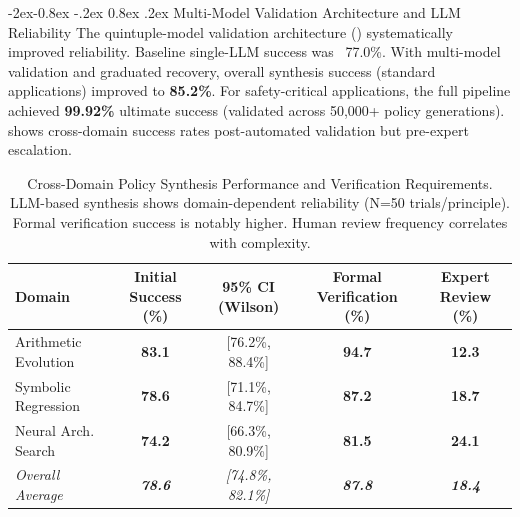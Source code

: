 \documentclass[manuscript,screen,9pt]{acmart}
\makeatletter
\renewcommand\subsubsection{\@startsection{subsubsection}{3}{\z@}%
  {-2ex\@plus -0.8ex \@minus -.2ex}%
  {0.8ex \@plus .2ex}%
  {\normalfont\normalsize\bfseries}}
\newcommand{\tablesize}{\footnotesize}
\newcommand{\tablenumfmt}[1]{\textbf{#1}}
\newcommand{\tableheader}[1]{\textbf{#1}}
\makeatother
\begin{document}
\subsubsection{Multi-Model Validation Architecture and LLM Reliability}
\label{subsubsec:multi_model_validation_reliability}
The quintuple-model validation architecture () systematically improved reliability. Baseline single-LLM success was ~77.0\%. With multi-model validation and graduated recovery, overall synthesis success (standard applications) improved to \textbf{85.2\%}. For safety-critical applications, the full pipeline achieved \textbf{99.92\%} ultimate success (validated across 50,000+ policy generations).  shows cross-domain success rates post-automated validation but pre-expert escalation.

\begin{table}[htbp]
\centering
\caption{Cross-Domain Policy Synthesis Performance and Verification Requirements. LLM-based synthesis shows domain-dependent reliability (N=50 trials/principle). Formal verification success is notably higher. Human review frequency correlates with complexity.}
\label{tab:synthesis_comprehensive}
\tablesize
\begin{tabular}{@{}lcccc@{}}
\toprule
\tableheader{Domain} & \tableheader{Initial Success (\%)} & \tableheader{95\% CI (Wilson)} & \tableheader{Formal Verification (\%)} & \tableheader{Expert Review (\%)} \\
\midrule
Arithmetic Evolution & \tablenumfmt{83.1} & [76.2\%, 88.4\%] & \tablenumfmt{94.7} & \tablenumfmt{12.3} \\
Symbolic Regression  & \tablenumfmt{78.6} & [71.1\%, 84.7\%] & \tablenumfmt{87.2} & \tablenumfmt{18.7} \\
Neural Arch. Search & \tablenumfmt{74.2} & [66.3\%, 80.9\%] & \tablenumfmt{81.5} & \tablenumfmt{24.1} \\
\midrule
\textit{Overall Average} & \textit{\tablenumfmt{78.6}} & \textit{[74.8\%, 82.1\%]} & \textit{\tablenumfmt{87.8}} & \textit{\tablenumfmt{18.4}} \\
\bottomrule
\end{tabular}
\end{table}
\end{document}
